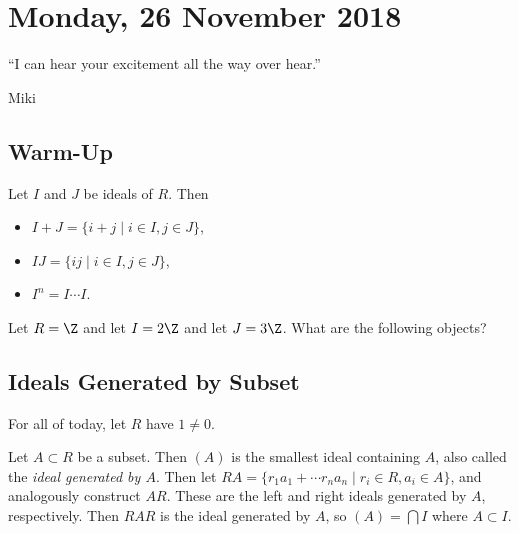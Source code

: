 \section{Monday, 26 November 2018}

\epigraph{``I can hear your excitement all the way over hear.''}{Miki}

\subsection{Warm-Up}

Let $I$ and $J$ be ideals of $R$. Then 
\begin{itemize}
\item $I +J = \{i+j \mid i \in I, j \in J\}$,
\item $IJ = \{ij \mid i \in I, j \in J\}$,
\item $I^n = I \cdots I$.
\end{itemize}

\begin{problem}[Warm-Up]
Let $R = \Z$ and let $I = 2\Z$ and let $J = 3\Z$.
What are the following objects?
\end{problem}

\subsection{Ideals Generated by Subset}

For all of today, let $R$ have $1 \not= 0$.

\begin{definition}
Let $A \subset R$ be a subset. Then $(A)$ is the smallest ideal containing $A$, also called the \emph{ideal generated by $A$}. Then let $RA = \{r_1a_1 + \cdots r_na_n \mid r_i \in R, a_i \in A\}$, and analogously construct $AR$. These are the left and right ideals generated by $A$, respectively. Then $RAR$ is the ideal generated by $A$, so $(A) = \bigcap I$ where $A \subset I$.
\end{definition}

